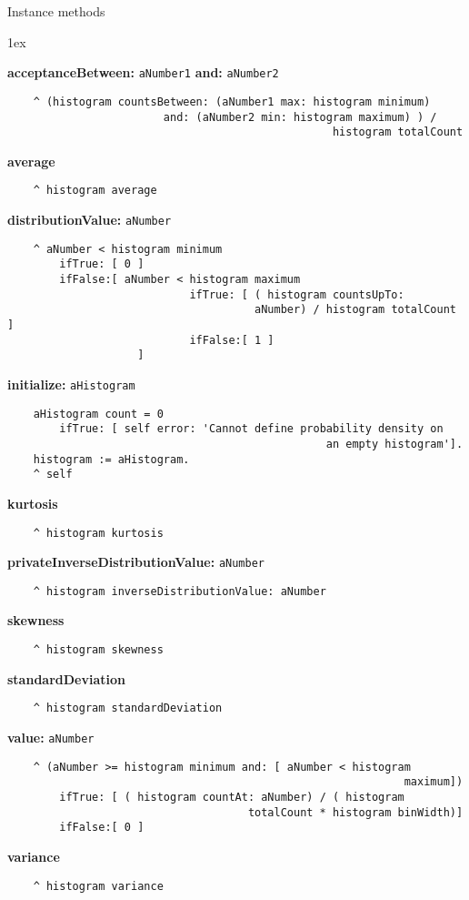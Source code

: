 Instance methods
{\parskip 1ex\par\noindent}
{\bf acceptanceBetween:} {\tt aNumber1} {\bf and:} {\tt aNumber2}
\begin{verbatim}
    ^ (histogram countsBetween: (aNumber1 max: histogram minimum)
                        and: (aNumber2 min: histogram maximum) ) / 
                                                  histogram totalCount

\end{verbatim}
{\bf average}
\begin{verbatim}
    ^ histogram average

\end{verbatim}
{\bf distributionValue:} {\tt aNumber}
\begin{verbatim}
    ^ aNumber < histogram minimum
        ifTrue: [ 0 ]
        ifFalse:[ aNumber < histogram maximum
                            ifTrue: [ ( histogram countsUpTo: 
                                      aNumber) / histogram totalCount ]
                            ifFalse:[ 1 ]
                    ]
\end{verbatim}
{\bf initialize:} {\tt aHistogram}
\begin{verbatim}
    aHistogram count = 0
        ifTrue: [ self error: 'Cannot define probability density on 
                                                 an empty histogram'].
    histogram := aHistogram.
    ^ self
\end{verbatim}
{\bf kurtosis}
\begin{verbatim}
    ^ histogram kurtosis
\end{verbatim}
{\bf privateInverseDistributionValue:} {\tt aNumber}
\begin{verbatim}
    ^ histogram inverseDistributionValue: aNumber
\end{verbatim}
{\bf skewness}
\begin{verbatim}
    ^ histogram skewness
\end{verbatim}
{\bf standardDeviation}
\begin{verbatim}
    ^ histogram standardDeviation
\end{verbatim}
{\bf value:} {\tt aNumber}
\begin{verbatim}
    ^ (aNumber >= histogram minimum and: [ aNumber < histogram 
                                                             maximum])
        ifTrue: [ ( histogram countAt: aNumber) / ( histogram 
                                     totalCount * histogram binWidth)]
        ifFalse:[ 0 ]
\end{verbatim}
{\bf variance}
\begin{verbatim}
    ^ histogram variance
\end{verbatim}

